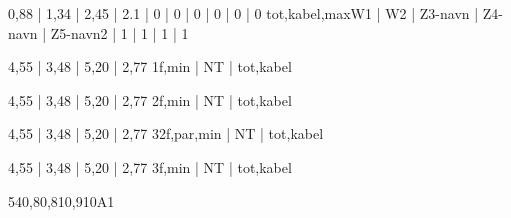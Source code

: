 \documentclass[a4paper,oneside,10pt,danish]{report}
\begin{document}
\begin{LV-Ztotal-max}{ 0,88 | 1,34 | 2,45 | 2.1 | 0 | 0 | 0 | 0 | 0 | 0 }{tot,kabel,max}{W1 | W2 | Z3-navn | Z4-navn | Z5-navn}{2 | 1 | 1 | 1 | 1}
\end{LV-Ztotal-max}

\begin{LV-Ik1f-kA}{ 4,55 | 3,48 | 5,20 | 2,77 }{1f,min | NT | tot,kabel}
\end{LV-Ik1f-kA}

\begin{LV-Ik2f-kA}{ 4,55 | 3,48 | 5,20 | 2,77 }{2f,min | NT | tot,kabel}
\end{LV-Ik2f-kA}

\begin{LV-Ik2f,parSikr-kA}{ 4,55 | 3,48 | 5,20 | 2,77 }{3}{2f,par,min | NT | tot,kabel}
\end{LV-Ik2f,parSikr-kA}

\begin{LV-Ik3f-kA}{ 4,55 | 3,48 | 5,20 | 2,77 }{3f,min | NT | tot,kabel}
\end{LV-Ik3f-kA}

\begin{faseKOMP-Iny}{540,8}{0,81}{0,9}{10}{A1}
\end{faseKOMP-Iny}
\end{document}
